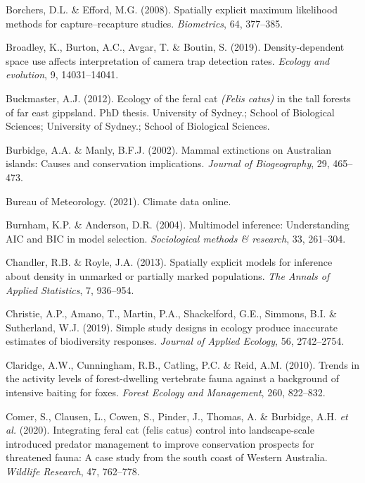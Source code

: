 \documentclass[11pt,a4paper,titlepage,twoside,openright]{style/unimelbthesis}
\begin{document}
\begin{mainmatter}
\leavevmode\hypertarget{ref-borchers2008spatially}{}%
Borchers, D.L. \& Efford, M.G. (2008). Spatially explicit maximum likelihood methods for capture--recapture studies. \emph{Biometrics}, 64, 377--385.

\leavevmode\hypertarget{ref-broadley2019density}{}%
Broadley, K., Burton, A.C., Avgar, T. \& Boutin, S. (2019). Density-dependent space use affects interpretation of camera trap detection rates. \emph{Ecology and evolution}, 9, 14031--14041.

\leavevmode\hypertarget{ref-buckmaster2012ecology}{}%
Buckmaster, A.J. (2012). Ecology of the feral cat \emph{(Felis catus)} in the tall forests of far east gippsland. PhD thesis. University of Sydney.; School of Biological Sciences; University of Sydney.; School of Biological Sciences.

\leavevmode\hypertarget{ref-burbidge2002mammal}{}%
Burbidge, A.A. \& Manly, B.F.J. (2002). Mammal extinctions on Australian islands: Causes and conservation implications. \emph{Journal of Biogeography}, 29, 465--473.

\leavevmode\hypertarget{ref-BOM2021}{}%
Bureau of Meteorology. (2021). Climate data online.

\leavevmode\hypertarget{ref-burnham2004multimodel}{}%
Burnham, K.P. \& Anderson, D.R. (2004). Multimodel inference: Understanding AIC and BIC in model selection. \emph{Sociological methods \& research}, 33, 261--304.

\leavevmode\hypertarget{ref-chandler2013spatially}{}%
Chandler, R.B. \& Royle, J.A. (2013). Spatially explicit models for inference about density in unmarked or partially marked populations. \emph{The Annals of Applied Statistics}, 7, 936--954.

\leavevmode\hypertarget{ref-christie2019simple}{}%
Christie, A.P., Amano, T., Martin, P.A., Shackelford, G.E., Simmons, B.I. \& Sutherland, W.J. (2019). Simple study designs in ecology produce inaccurate estimates of biodiversity responses. \emph{Journal of Applied Ecology}, 56, 2742--2754.

\leavevmode\hypertarget{ref-claridge2010trends}{}%
Claridge, A.W., Cunningham, R.B., Catling, P.C. \& Reid, A.M. (2010). Trends in the activity levels of forest-dwelling vertebrate fauna against a background of intensive baiting for foxes. \emph{Forest Ecology and Management}, 260, 822--832.

\leavevmode\hypertarget{ref-comer2020integrating}{}%
Comer, S., Clausen, L., Cowen, S., Pinder, J., Thomas, A. \& Burbidge, A.H. \emph{et al.} (2020). Integrating feral cat (felis catus) control into landscape-scale introduced predator management to improve conservation prospects for threatened fauna: A case study from the south coast of Western Australia. \emph{Wildlife Research}, 47, 762--778.


\end{mainmatter}
\end{document}
